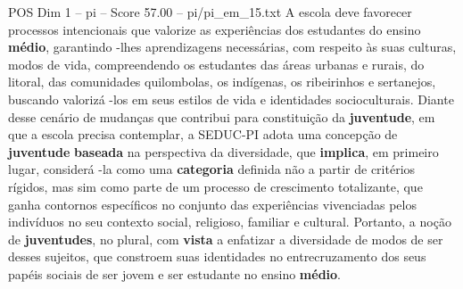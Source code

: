 \begin{textsample}{POS Dim 1 – pi – Score 57.00 – pi/pi\_em\_15.txt}
A escola deve favorecer processos intencionais que valorize as experiências dos estudantes do ensino \textbf{médio}, garantindo -lhes aprendizagens necessárias, com respeito às suas culturas, modos de vida, compreendendo os estudantes das áreas urbanas e rurais, do litoral, das comunidades quilombolas, os indígenas, os ribeirinhos e sertanejos, buscando valorizá -los em seus estilos de vida e identidades socioculturais.
Diante desse cenário de mudanças que contribui para constituição da \textbf{juventude}, em que a escola precisa contemplar, a SEDUC-PI adota uma concepção de \textbf{juventude} \textbf{baseada} na perspectiva da diversidade, que \textbf{implica}, em primeiro lugar, considerá -la como uma \textbf{categoria} definida não a partir de critérios rígidos, mas sim como parte de um processo de crescimento totalizante, que ganha contornos específicos no conjunto das experiências vivenciadas pelos indivíduos no seu contexto social, religioso, familiar e cultural.
Portanto, a noção de \textbf{juventudes}, no plural, com \textbf{vista} a enfatizar a diversidade de modos de ser desses sujeitos, que constroem suas identidades no entrecruzamento dos seus papéis sociais de ser jovem e ser estudante no ensino \textbf{médio}.

\end{textsample}
